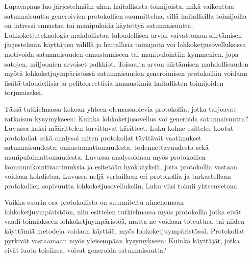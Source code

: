 Lupavapaus luo järjestelmään uhan haitallisista toimijoista, mikä vaikeuttaa satunnaisuutta generoivien protokollien suunnittelua, sillä haitallisilla toimijoilla on intressi ennustaa tai manipuloida käytettyä satunnaisuutta. Lohkoketjuteknologia mahdollistaa taloudellisen arvon vaivattoman siirtämisen järjestelmän käyttäjien välillä ja haitallisia toimijoita voi lohkoketjusovelluksissa motivoida satunnaisuuden ennustamiseen tai manipulointiin kymmenien, jopa satojen, miljoonien arvoiset palkkiot. Toisaalta arvon siirtämisen mahdollisuuden myötä lohkoketjuympäristössä satunnaisuuden generoimisen protokolliin voidaan lisätä taloudellisia ja peliteoreettisia kannustimia haitallisten toimijoiden torjumiseksi.

Tässä tutkielmassa kokoan yhteen olemassaolevia protokollia, jotka tarjoavat ratkaisun kysymykseen: Kuinka lohkoketjusovellus voi generoida satunnaisuutta? Luvussa kaksi määrittelen tarvittavat käsitteet. Luku kolme esittelee kootut protokollat sekä analysoi miten protokollat täyttävät vaatimukset satunnaisuudesta, ennustamattomuudesta, todennettavuudesta sekä manipuloimattomuudesta. Luvussa analysoidaan myös protokollien kommunikointivaatimuksia ja esitetään hyökkäyksiä, joita protokollia vastaan voidaan kohdistaa. Luvussa neljä vertaillaan eri protokollia ja tarkastellaan protokollien sopivuutta lohkoketjusovelluksiin. Luku viisi toimii yhteenvetona.

Vaikka suurin osa protokollista on suunniteltu nimenomaan lohkoketjuympäristöön, niin esittelen tutkielmassa myös protokollia jotka eivät vaadi toimiakseen lohkoketjuympäristöä, mutta ne voidaan toteuttaa, tai niiden käyttämiä metodeja voidaan käyttää, myös lohkoketjuympäristössä. Protokollat pyrkivät vastaamaan myös yleisempään kysymykseen: Kuinka käyttäjät, jotka eivät luota toisiinsa, voivat generoida satunnaisuutta? 

